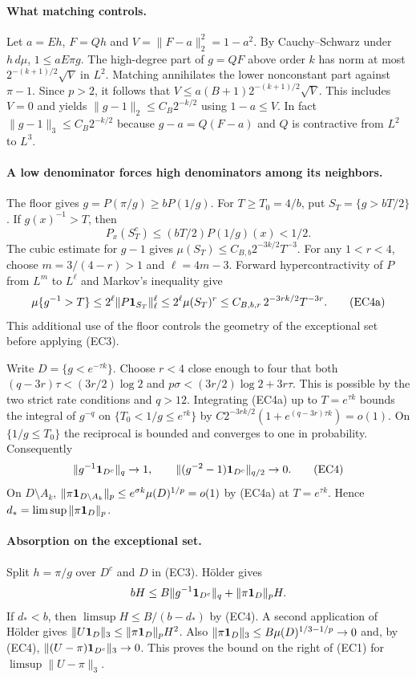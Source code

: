 \paragraph{What matching controls.}
Let $a=E h$, $F=Qh$ and $V=\|F-a\|_2^2=1-a^2$. By Cauchy--Schwarz
under $h\,d\mu$, $1\le a E\pi g$. The high-degree part of $g=QF$
above order $k$ has norm at most $2^{-(k+1)/2}\sqrt V$ in $L^2$.
Matching annihilates the lower nonconstant part against $\pi-1$.
Since $p>2$, it follows that
$V\le a(B+1)2^{-(k+1)/2}\sqrt V$. This includes $V=0$ and yields
$\|g-1\|_2\le C_B2^{-k/2}$ using $1-a\le V$.
In fact $\|g-1\|_3\le C_B2^{-k/2}$ because $g-a=Q(F-a)$ and $Q$
is contractive from $L^2$ to $L^3$.

\paragraph{A low denominator forces high denominators among its neighbors.}
The floor gives $g=P(\pi/g)\ge bP(1/g)$. For $T\ge T_0=4/b$, put
$S_T=\{g>bT/2\}$. If $g(x)^{-1}>T$, then
\[
 P_x(S_T^c)\le(bT/2)P(1/g)(x)<1/2 .
\]
The cubic estimate for $g-1$ gives
$\mu(S_T)\le C_{B,b}2^{-3k/2}T^{-3}$. For any $1<r<4$, choose
$m=3/(4-r)>1$ and $\ell=4m-3$. Forward hypercontractivity of $P$
from $L^m$ to $L^\ell$ and Markov's inequality give
\[
 \mu\{g^{-1}>T\}\le 2^\ell\|P{\bf1}_{S_T}\|_\ell^\ell
 \le 2^\ell\mu(S_T)^r
 \le C_{B,b,r}\,2^{-3rk/2}T^{-3r}.                 \tag{EC4a}
\]
This additional use of the floor controls the geometry of the exceptional
set before applying (EC3).

Write $D=\{g<e^{-\tau k}\}$. Choose $r<4$ close enough to four that both
$(q-3r)\tau<(3r/2)\log 2$ and
$p\sigma<(3r/2)\log 2+3r\tau$. This is possible by the two strict rate
conditions and $q>12$. Integrating (EC4a) up to $T=e^{\tau k}$ bounds
the integral of $g^{-q}$ on $\{T_0<1/g\le e^{\tau k}\}$ by
$C2^{-3rk/2}(1+e^{(q-3r)\tau k})=o(1)$.
On $\{1/g\le T_0\}$ the reciprocal is bounded and converges to one in
probability. Consequently
\[
 \|g^{-1}{\bf1}_{D^c}\|_q\to1,\qquad
 \|(g^{-2}-1){\bf1}_{D^c}\|_{q/2}\to0 .           \tag{EC4}
\]
On $D\setminus A_k$, $\|\pi{\bf1}_{D\setminus A_k}\|_p
 \le e^{\sigma k}\mu(D)^{1/p}=o(1)$ by (EC4a) at $T=e^{\tau k}$.
Hence $d_*=\limsup\|\pi{\bf1}_D\|_p$.

\paragraph{Absorption on the exceptional set.}
Split $h=\pi/g$ over $D^c$ and $D$ in (EC3). H\"older gives
\[
 bH\le B\|g^{-1}{\bf1}_{D^c}\|_q+\|\pi{\bf1}_D\|_p H .
\]
If $d_*<b$, then $\limsup H\le B/(b-d_*)$ by (EC4). A second application
of H\"older gives $\|U{\bf1}_D\|_3\le\|\pi{\bf1}_D\|_p H^2$.
Also $\|\pi{\bf1}_D\|_3\le B\mu(D)^{1/3-1/p}\to0$ and, by (EC4),
$\|(U-\pi){\bf1}_{D^c}\|_3\to0$. This proves the bound on the right of
(EC1) for $\limsup\|U-\pi\|_3$.

